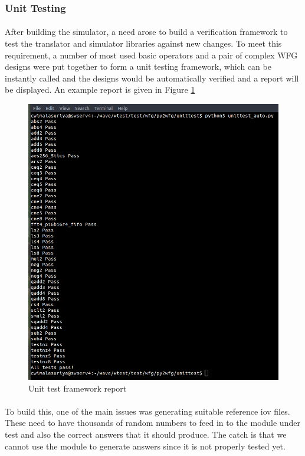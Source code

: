 \subsubsection{Unit Testing}
\label{sec:unittest}
\paragraph{}
After building the simulator, a need arose to build a verification framework to test the translator and simulator libraries against new changes. To meet this requirement, a number of most used basic operators and a pair of complex WFG designs were put together to form a unit testing framework, which can be instantly called and the designs would be automatically verified and a report will be displayed. An example report is given in Figure \ref{Fig:utest}

\begin{figure}[H]
    \centering
    \includegraphics[trim=0cm 0cm 0cm 0cm, clip=true,scale=0.5]{figures/utest.png}
    \caption{Unit test framework report\label{Fig:utest}}\vspace{-4mm}
    \end{figure}

\paragraph{}
To build this, one of the main issues was generating suitable reference iov files. These need to have thousands of random numbers to feed in to the module under test and also the correct answers that it should produce. The catch is that we cannot use the module to generate answers since it is not properly tested yet. 

